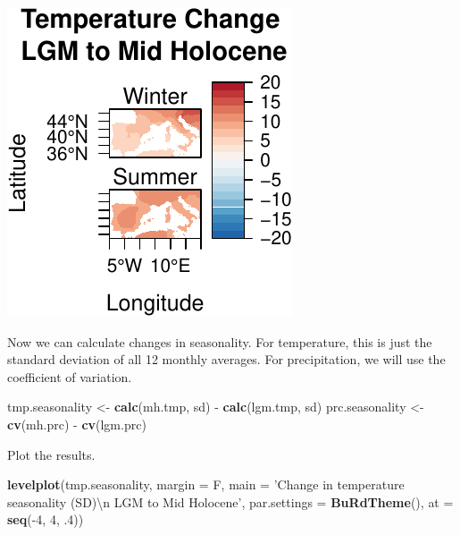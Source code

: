 \documentclass[11pt,]{tufte-handout}
\newenvironment{Shaded}{}{}
\newcommand{\KeywordTok}[1]{\textcolor[rgb]{0.00,0.44,0.13}{\textbf{{#1}}}}
\newcommand{\DataTypeTok}[1]{\textcolor[rgb]{0.56,0.13,0.00}{{#1}}}
\newcommand{\DecValTok}[1]{\textcolor[rgb]{0.25,0.63,0.44}{{#1}}}
\newcommand{\CharTok}[1]{\textcolor[rgb]{0.25,0.44,0.63}{{#1}}}
\newcommand{\StringTok}[1]{\textcolor[rgb]{0.25,0.44,0.63}{{#1}}}
\newcommand{\NormalTok}[1]{{#1}}
\begin{document}
\includegraphics{proxymodelcomparison_files/figure-latex/unnamed-chunk-6-2}

Now we can calculate changes in seasonality. For temperature, this is
just the standard deviation of all 12 monthly averages. For
precipitation, we will use the coefficient of variation.

\begin{Shaded}
\begin{Highlighting}[]
\NormalTok{tmp.seasonality <-}\StringTok{ }\KeywordTok{calc}\NormalTok{(mh.tmp, sd) -}\StringTok{ }\KeywordTok{calc}\NormalTok{(lgm.tmp, sd)}
\NormalTok{prc.seasonality <-}\StringTok{ }\KeywordTok{cv}\NormalTok{(mh.prc) -}\StringTok{ }\KeywordTok{cv}\NormalTok{(lgm.prc)}
\end{Highlighting}
\end{Shaded}

Plot the results.

\begin{Shaded}
\begin{Highlighting}[]
\KeywordTok{levelplot}\NormalTok{(tmp.seasonality, }\DataTypeTok{margin =} \NormalTok{F, }
          \DataTypeTok{main =} \StringTok{'Change in temperature seasonality (SD)}\CharTok{\textbackslash{}n}\StringTok{ LGM to Mid Holocene'}\NormalTok{, }
          \DataTypeTok{par.settings =} \KeywordTok{BuRdTheme}\NormalTok{(), }
          \DataTypeTok{at =} \KeywordTok{seq}\NormalTok{(-}\DecValTok{4}\NormalTok{, }\DecValTok{4}\NormalTok{, .}\DecValTok{4}\NormalTok{))}
\end{Highlighting}
\end{Shaded}
\end{document}
